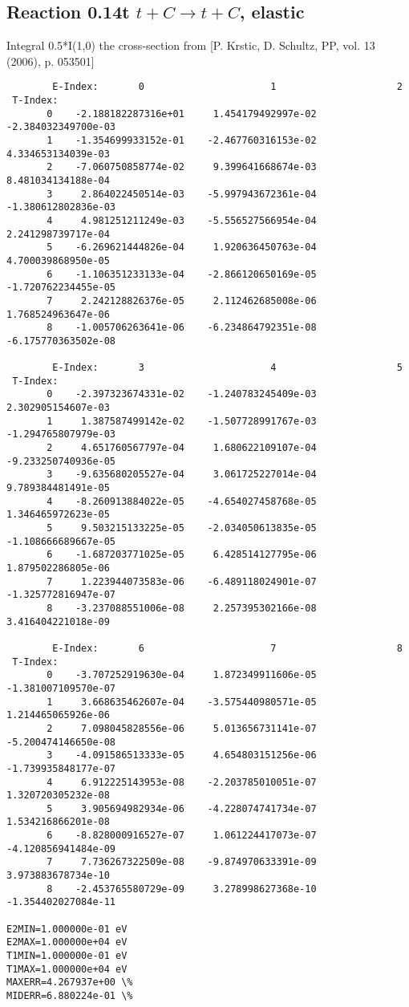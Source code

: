 \documentclass[12pt,dvipdfmx]{article}
\begin{document}
\subsection{
Reaction 0.14t  $t + C \rightarrow t + C$, elastic}

Integral 0.5*I(1,0) the cross-section from [P. Krstic, D. Schultz, PP, vol. 13 (2006), p. 053501]

\begin{small}\begin{verbatim}
        E-Index:       0                      1                     2
 T-Index:
       0    -2.188182287316e+01     1.454179492997e-02    -2.384032349700e-03
       1    -1.354699933152e-01    -2.467760316153e-02     4.334653134039e-03
       2    -7.060750858774e-02     9.399641668674e-03     8.481034134188e-04
       3     2.864022450514e-03    -5.997943672361e-04    -1.380612802836e-03
       4     4.981251211249e-03    -5.556527566954e-04     2.241298739717e-04
       5    -6.269621444826e-04     1.920636450763e-04     4.700039868950e-05
       6    -1.106351233133e-04    -2.866120650169e-05    -1.720762234455e-05
       7     2.242128826376e-05     2.112462685008e-06     1.768524963647e-06
       8    -1.005706263641e-06    -6.234864792351e-08    -6.175770363502e-08

        E-Index:       3                      4                     5
 T-Index:
       0    -2.397323674331e-02    -1.240783245409e-03     2.302905154607e-03
       1     1.387587499142e-02    -1.507728991767e-03    -1.294765807979e-03
       2     4.651760567797e-04     1.680622109107e-04    -9.233250740936e-05
       3    -9.635680205527e-04     3.061725227014e-04     9.789384481491e-05
       4    -8.260913884022e-05    -4.654027458768e-05     1.346465972623e-05
       5     9.503215133225e-05    -2.034050613835e-05    -1.108666689667e-05
       6    -1.687203771025e-05     6.428514127795e-06     1.879502286805e-06
       7     1.223944073583e-06    -6.489118024901e-07    -1.325772816947e-07
       8    -3.237088551006e-08     2.257395302166e-08     3.416404221018e-09

        E-Index:       6                      7                     8
 T-Index:
       0    -3.707252919630e-04     1.872349911606e-05    -1.381007109570e-07
       1     3.668635462607e-04    -3.575440980571e-05     1.214465065926e-06
       2     7.098045828556e-06     5.013656731141e-07    -5.200474146650e-08
       3    -4.091586513333e-05     4.654803151256e-06    -1.739935848177e-07
       4     6.912225143953e-08    -2.203785010051e-07     1.320720305232e-08
       5     3.905694982934e-06    -4.228074741734e-07     1.534216866201e-08
       6    -8.828000916527e-07     1.061224417073e-07    -4.120856941484e-09
       7     7.736267322509e-08    -9.874970633391e-09     3.973883678734e-10
       8    -2.453765580729e-09     3.278998627368e-10    -1.354402027084e-11

E2MIN=1.000000e-01 eV
E2MAX=1.000000e+04 eV
T1MIN=1.000000e-01 eV
T1MAX=1.000000e+04 eV
MAXERR=4.267937e+00 \%
MIDERR=6.880224e-01 \%
\end{verbatim}\end{small}
\newpage
\end{document}
